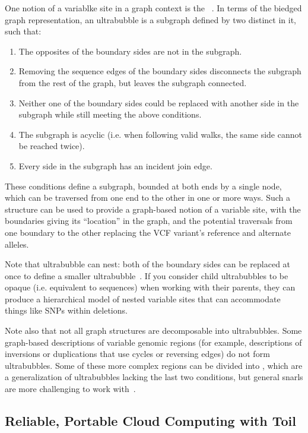One notion of a variablke site in a graph context is the ~\cite{paten2017superbubbles}. In terms of the biedged graph representation, an ultrabubble is a subgraph defined by two distinct  in it, such that:
\begin{enumerate}
    \item The opposites of the boundary sides are not in the subgraph.
    \item Removing the sequence edges of the boundary sides disconnects the subgraph from the rest of the graph, but leaves the subgraph connected.
    \item Neither one of the boundary sides could be replaced with another side in the subgraph while still meeting the above conditions.
    \item The subgraph is acyclic (i.e. when following valid walks, the same side cannot be reached twice).
    \item Every side in the subgraph has an incident join edge.
\end{enumerate}

These conditions define a subgraph, bounded at both ends by a single node, which can be traversed from one end to the other in one or more ways. Such a structure can be used to provide a graph-based notion of a variable site, with the boundaries giving its ``location'' in the graph, and the potential traversals from one boundary to the other replacing the VCF variant's reference and alternate alleles.

Note that ultrabubble can nest: both of the boundary sides can be replaced at once to define a smaller  ultrabubble~\cite{paten2017superbubbles}. If you consider child ultrabubbles to be opaque (i.e. equivalent to sequences) when working with their parents, they can produce a hierarchical model of nested variable sites that can accommodate things like SNPs within deletions.

Note also that not all graph structures are decomposable into ultrabubbles. Some graph-based descriptions of variable genomic regions (for example, descriptions of inversions or duplications that use cycles or reversing edges) do not form ultrabubbles. Some of these more complex regions can be divided into , which are a generalization of ultrabubbles lacking the last two conditions, but general snarls are more challenging to work with~\cite{paten2017superbubbles}.

\subsection{Reliable, Portable Cloud Computing with Toil}

